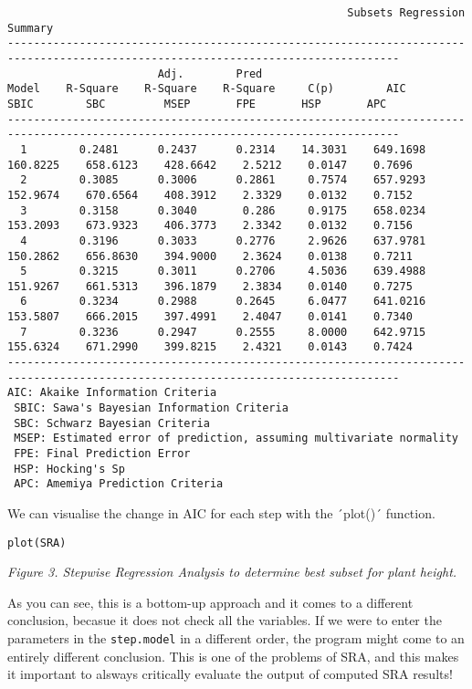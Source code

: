 \documentclass[
]{article}
\begin{document}
\begin{verbatim}
                                                    Subsets Regression Summary                                                    
----------------------------------------------------------------------------------------------------------------------------------
                       Adj.        Pred                                                                                            
Model    R-Square    R-Square    R-Square     C(p)        AIC         SBIC        SBC         MSEP       FPE       HSP       APC  
----------------------------------------------------------------------------------------------------------------------------------
  1        0.2481      0.2437      0.2314    14.3031    649.1698    160.8225    658.6123    428.6642    2.5212    0.0147    0.7696 
  2        0.3085      0.3006      0.2861     0.7574    657.9293    152.9674    670.6564    408.3912    2.3329    0.0132    0.7152 
  3        0.3158      0.3040       0.286     0.9175    658.0234    153.2093    673.9323    406.3773    2.3342    0.0132    0.7156 
  4        0.3196      0.3033      0.2776     2.9626    637.9781    150.2862    656.8630    394.9000    2.3624    0.0138    0.7211 
  5        0.3215      0.3011      0.2706     4.5036    639.4988    151.9267    661.5313    396.1879    2.3834    0.0140    0.7275 
  6        0.3234      0.2988      0.2645     6.0477    641.0216    153.5807    666.2015    397.4991    2.4047    0.0141    0.7340 
  7        0.3236      0.2947      0.2555     8.0000    642.9715    155.6324    671.2990    399.8215    2.4321    0.0143    0.7424 
----------------------------------------------------------------------------------------------------------------------------------
AIC: Akaike Information Criteria 
 SBIC: Sawa's Bayesian Information Criteria 
 SBC: Schwarz Bayesian Criteria 
 MSEP: Estimated error of prediction, assuming multivariate normality 
 FPE: Final Prediction Error 
 HSP: Hocking's Sp 
 APC: Amemiya Prediction Criteria
\end{verbatim}

We can visualise the change in AIC for each step with the ´plot()´
function.

\begin{verbatim}
plot(SRA)
\end{verbatim}

\emph{Figure 3. Stepwise Regression Analysis to determine best subset
for plant height.}

As you can see, this is a bottom-up approach and it comes to a different
conclusion, becasue it does not check all the variables. If we were to
enter the parameters in the \texttt{step.model} in a different order,
the program might come to an entirely different conclusion. This is one
of the problems of SRA, and this makes it important to alsways
critically evaluate the output of computed SRA results!
\end{document}
